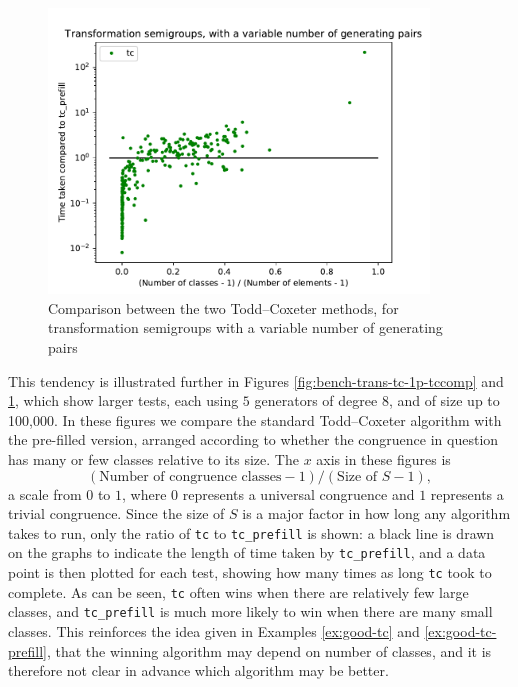 \begin{figure}[p]
  \centering
  \includegraphics[width=0.9\textwidth]{pics/ch-pairs/bench-trans-tc-vp-tccomp}
  \caption[Benchmark: Todd--Coxeter, concrete, $n$ pairs]
  {Comparison between the two Todd--Coxeter methods, for transformation
    semigroups with a variable number of generating pairs}
  \label{fig:bench-trans-tc-vp-tccomp}
\end{figure}

This tendency is illustrated further in Figures
\ref{fig:bench-trans-tc-1p-tccomp} and
\ref{fig:bench-trans-tc-vp-tccomp}, which show larger tests, each using $5$
generators of degree $8$, and of size up to 100,000.  In these figures we
compare the standard Todd--Coxeter algorithm with the pre-filled version, arranged
according to whether the congruence in question has many or few classes relative
to its size.  The $x$ axis in these figures is
$$(\text{Number of congruence classes} - 1) / (\text{Size of~} S - 1),$$
a scale from $0$ to $1$, where $0$ represents a universal congruence and $1$
represents a trivial congruence.  Since the size of $S$ is a major factor in how
long any algorithm takes to run, only the ratio of \texttt{tc} to
\texttt{tc\_prefill} is shown: a black line is drawn on the graphs to indicate
the length of time taken by \texttt{tc\_prefill}, and a data point is then
plotted for each test, showing how many times as long \texttt{tc} took to
complete.  As can be seen, \texttt{tc} often wins when there are relatively few
large classes, and \texttt{tc\_prefill} is much more likely to win when there are
many small classes.  This reinforces the idea given in Examples \ref{ex:good-tc}
and \ref{ex:good-tc-prefill}, that the winning algorithm may depend on number of
classes, and it is therefore not clear in advance which algorithm may be better.

